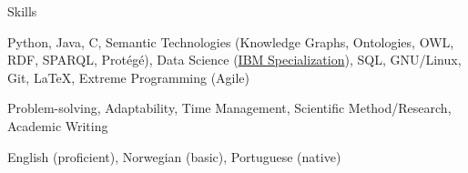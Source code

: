 %
\begin{rSection}{Skills}
    \begin{description}[nosep]
        \item[Technical:] Python, Java, C, Semantic Technologies (Knowledge Graphs, Ontologies, OWL, RDF, SPARQL, Protégé), Data Science (\href{https://www.coursera.org/account/accomplishments/specialization/certificate/V45HAAHQS4AE}{IBM Specialization}), SQL, GNU/Linux, Git, \LaTeX, Extreme Programming (Agile)
        \item[Soft:] Problem-solving, Adaptability, Time Management, Scientific Method/Research, Academic Writing
        \item[Languages:] English (proficient), Norwegian (basic), Portuguese (native)
    \end{description}
    
\end{rSection}

